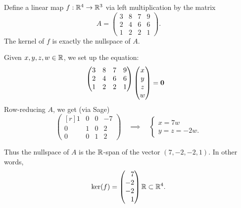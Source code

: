 \documentclass[../algebraNotesMSRI-UP2016.tex]{subfiles}
\begin{document}
\begin{frame}[fragile]{}{}
\begin{ex}\label{ex:kernalAsAZeroSet}
Define a linear map $f:\mathbb R^4\to \mathbb R^3$ via left multiplication by the matrix
\[
A=\begin{pmatrix}
3 & 8 & 7 & 9 \\
2 & 4 & 6 & 6 \\
1 & 2 & 2 & 1
\end{pmatrix}.
\]
The kernel of $f$ is exactly the nullspace of $A$.
\end{ex}

\smallGap
Given $x,y,z,w\in \mathbb R$, we set up the equation:
\begin{align*}
\begin{matrix}
\begin{pmatrix*}[r]
3 & 8 & 7 & 9 \\
2 & 4 & 6 & 6 \\
1 & 2 & 2 & 1 \\
\end{pmatrix*} \\
\mbox{}
\end{matrix} &
\begin{pmatrix}
x \\
y \\
z \\
w
\end{pmatrix}= \vect 0
\end{align*}
Row-reducing $A$, we get (via Sage)
\[
\begin{pmatrix*}[r]
1 & 0 & 0 & -7 \\
0 & 1 & 0 & 2 \\
0 & 0 & 1 & 2
\end{pmatrix*} \quad \implies 
\quad \left\{\begin{array}{l}
	x=7w \\
	y=z=-2w.
	\end{array}\right.
\]
\end{frame}

\begin{frame}[c]
Thus the nullspace of $A$ is the $\mathbb R$-span of the vector $(7,-2,-2,1)$.  In other words, 
\[
\ker(f)=\begin{pmatrix*}[r]
	7 \\
	-2 \\
	-2 \\
	1
	\end{pmatrix*}\R\subset \R^4.
\]
\end{frame}
\end{document}
